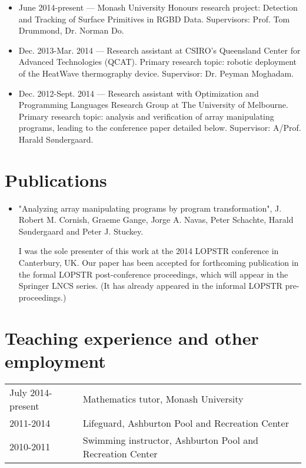 \documentclass[12pt,a4paper]{article}
\newenvironment{llist}
	{\renewcommand{\arraystretch}{1.5}\begin{longtable}{p{3.5cm} p{12cm}}}
	{\end{longtable}}
\begin{document}
\begin{itemize}
  \item June 2014-present --- Monash University Honours research project:
    Detection and Tracking of Surface Primitives in RGBD Data. Supervisors:
    Prof. Tom Drummond, Dr. Norman Do.

  \item Dec. 2013-Mar. 2014 --- Research assistant at CSIRO's Queensland Center
    for Advanced Technologies (QCAT). Primary research topic: robotic
    deployment of the HeatWave thermography device. Supervisor: Dr. Peyman
    Moghadam.

  \item Dec. 2012-Sept. 2014 --- Research assistant with Optimization and
    Programming Languages Research Group at The University of Melbourne.
    Primary research topic: analysis and verification of array manipulating
    programs, leading to the conference paper detailed below. Supervisor:
    A/Prof. Harald S\o ndergaard.
\end{itemize}

\section*{Publications}

\begin{itemize}
  \item "Analyzing array manipulating programs by program transformation", J.
    Robert M.  Cornish, Graeme Gange, Jorge A. Navas, Peter Schachte, Harald
    S\o ndergaard and Peter J. Stuckey.
    
    I was the sole presenter of this work at the 2014 LOPSTR conference in
    Canterbury, UK. Our paper has been accepted for forthcoming publication in
    the formal LOPSTR post-conference proceedings, which will appear in the
    Springer LNCS series. (It has already appeared in the informal LOPSTR
    pre-proceedings.)
\end{itemize}

\section*{Teaching experience and other employment}
\begin{llist}
  July 2014-present & Mathematics tutor, Monash University \\
	2011-2014 & Lifeguard, Ashburton Pool and Recreation Center \\
	2010-2011 & Swimming instructor, Ashburton Pool and Recreation Center \\
\end{llist}
\end{document}
